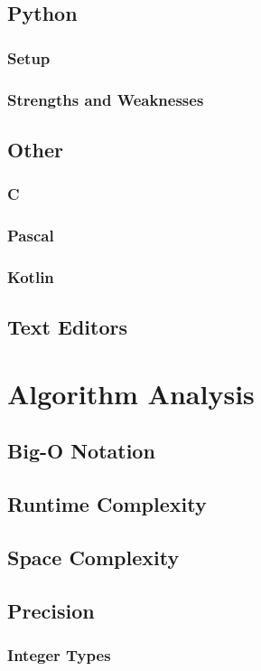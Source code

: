 \documentclass[12pt]{article}
\begin{document}
\subsection{Python}
\subsubsection{Setup}
\subsubsection{Strengths and Weaknesses}
\subsection{Other}
\subsubsection{C}
\subsubsection{Pascal}
\subsubsection{Kotlin}
\subsection{Text Editors}

\section{Algorithm Analysis}
\subsection{Big-O Notation}
\subsection{Runtime Complexity}
\subsection{Space Complexity}
\subsection{Precision}
\subsubsection{Integer Types}
\end{document}
